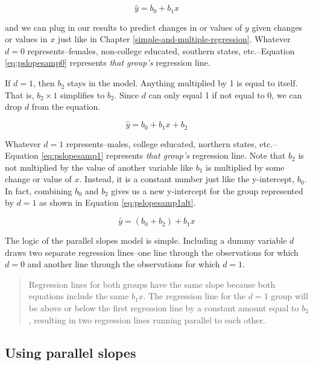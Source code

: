 \documentclass[
]{book}
\begin{document}
\begin{equation}
\hat{y} = b_0 + b_1x
\label{eq:pslopesamp0}
\end{equation}

and we can plug in our results to predict changes in or values of \(y\) given changes or values in \(x\) just like in Chapter \ref{simple-and-multiple-regression}. Whatever \(d=0\) represents--females, non-college educated, southern states, etc.--Equation \eqref{eq:pslopesamp0} represents \emph{that group's} regression line.

If \(d=1\), then \(b_2\) stays in the model. Anything multiplied by 1 is equal to itself. That is, \(b_2 \times 1\) simplifies to \(b_2\). Since \(d\) can only equal 1 if not equal to 0, we can drop \(d\) from the equation.

\begin{equation}
\hat{y} = b_0 + b_1x + b_2
\label{eq:pslopesamp1}
\end{equation}

Whatever \(d=1\) represents--males, college educated, northern states, etc.--Equation \eqref{eq:pslopesamp1} represents \emph{that group's} regression line. Note that \(b_2\) is not multiplied by the value of another variable like \(b_1\) is multiplied by some change or value of \(x\). Instead, it is a constant number just like the y-intercept, \(b_0\). In fact, combining \(b_0\) and \(b_2\) gives us a new y-intercept for the group represented by \(d=1\) as shown in Equation \eqref{eq:pslopesamp1alt}.

\begin{equation}
\hat{y} = (b_0 + b_2) + b_1x
\label{eq:pslopesamp1alt}
\end{equation}

The logic of the parallel slopes model is simple. Including a dummy variable \(d\) draws two separate regression lines--one line through the observations for which \(d=0\) and another line through the observations for which \(d=1\).

\begin{quote}
Regression lines for both groups have the same slope because both equations include the same \(b_1x\). The regression line for the \(d=1\) group will be above or below the first regression line by a constant amount equal to \(b_2\), resulting in two regression lines running parallel to each other.
\end{quote}

\hypertarget{using-parallel-slopes}{%
\subsection{Using parallel slopes}\label{using-parallel-slopes}}
\end{document}
